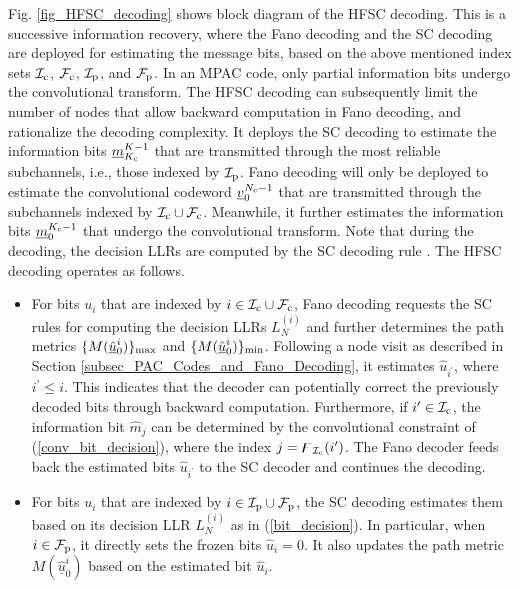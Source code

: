 \documentclass[12pt, draftclsnofoot, peerreview, onecolumn]{IEEEtran}
\theoremstyle{noparent}
\begin{document}
Fig. \ref{fig_HFSC_decoding} shows block diagram of the HFSC decoding.
This is a successive information recovery, 
where the Fano decoding and the SC decoding are deployed for estimating the message bits, based on
the above mentioned index sets $\mathcal{I}_{\rm c}$, $\mathcal{F}_{\rm c}$, 
$\mathcal{I}_{\rm p}$, and $\mathcal{F}_{\rm p}$.
In an MPAC code, only partial information bits undergo the 
convolutional transform.  
The HFSC decoding can subsequently limit the number of nodes that allow backward computation in Fano decoding, and rationalize the decoding complexity.
It deploys the SC decoding to estimate the information bits $\underline{m}_{K_{\rm c}}^{K-1}$
that are transmitted through the most reliable subchannels, i.e., those
indexed by $\mathcal{I}_{\rm p}$.
Fano decoding will only be deployed to estimate the convolutional
codeword $\underline{v}_{0}^{N_{\rm c}-1}$ that are transmitted
through the subchannels indexed by 
$\mathcal{I}_{\rm c} \cup \mathcal{F}_{\rm c}$. 
Meanwhile, it further estimates the information bits $\underline{m}_{0}^{K_{\rm c}-1}$ 
that undergo the convolutional transform.
Note that during the decoding, 
the decision LLRs are computed by the SC decoding rule \cite{BalatsoukasStimming2015LLRBasedSuccessive}.
The HFSC decoding operates as follows.
\begin{itemize}
    \item For bits $u_i$ that are indexed by $i \in \mathcal{I}_{\rm c} \cup \mathcal{F}_{\rm c}$, 
        Fano decoding requests the SC rules for computing the decision LLRs $L_{N}^{(i)}$
        and further determines the path metrics $\{M(\underline{\hat{u}}_{0}^{i})\}_{\rm{max}} $ and 
        $\{M(\underline{\hat{u}}_{0}^{i})\}_{\rm{min}} $.
        Following a node visit as described in Section \ref{subsec_PAC_Codes_and_Fano_Decoding}, it
        estimates $\hat{u}_{i^{\prime}}$, where $i^{\prime}\leq i$. 
        This indicates that the decoder can potentially correct the previously decoded bits through backward computation.
        Furthermore, if $i' \in \mathcal{I}_{\rm c}$, the information
        bit $\hat{m}_{j}$ can be determined by the convolutional constraint
        of (\ref{conv_bit_decision}),
        where the index $j=\digamma_{\mathcal{I}_{\rm c}}(i')$.
        The Fano decoder feeds back 
        the estimated bits $\hat{u}_{i^{\prime}}$ to the SC decoder 
        and continues the decoding.
    \item For bits $u_i$ that are indexed by $i \in \mathcal{I}_{\rm p} \cup \mathcal{F}_{\rm p}$,
        the SC decoding estimates them based on 
        its decision LLR $L_{N}^{(i)}$ as in (\ref{bit_decision}).
        In particular, when $i\in \mathcal{F}_{\rm p}$, 
        it directly sets the frozen bits $\hat{u}_{i}=0$.
        It also updates the path metric $M(\underline{\hat{u}}_{0}^{i})$
        based on the estimated bit $\hat{u}_{i}$. 
\end{itemize}
\end{document}
